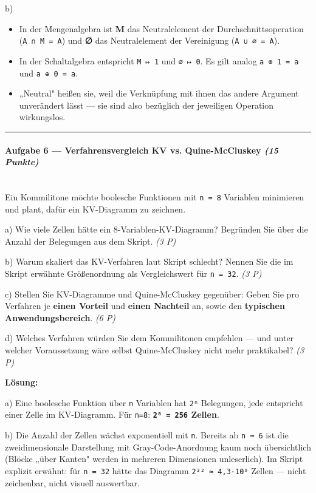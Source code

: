 \documentclass[11pt, a4paper]{article}
\begin{document}
b)

\begin{itemize}
  \item In der Mengenalgebra ist \textbf{M} das Neutralelement der Durchschnittsoperation (\texttt{A ∩ M = A}) und \textbf{∅} das Neutralelement der Vereinigung (\texttt{A ∪ ∅ = A}).
  \item In der Schaltalgebra entspricht \texttt{M ↦ 1} und \texttt{∅ ↦ 0}. Es gilt analog \texttt{a ⊗ 1 = a} und \texttt{a ⊕ 0 = a}.
  \item „Neutral" heißen sie, weil die Verknüpfung mit ihnen das andere Argument unverändert lässt — sie sind also bezüglich der jeweiligen Operation wirkungslos.
\end{itemize}


\noindent\textcolor{rulegray}{\rule{\linewidth}{0.4pt}}


\paragraph{Aufgabe 6 — Verfahrensvergleich KV vs. Quine-McCluskey \textit{(15 Punkte)}}\mbox{}\\[2pt]

Ein Kommilitone möchte boolesche Funktionen mit \texttt{n = 8} Variablen minimieren und plant, dafür ein KV-Diagramm zu zeichnen.


a) Wie viele Zellen hätte ein 8-Variablen-KV-Diagramm? Begründen Sie über die Anzahl der Belegungen aus dem Skript. \textit{(3 P)}


b) Warum skaliert das KV-Verfahren laut Skript schlecht? Nennen Sie die im Skript erwähnte Größenordnung als Vergleichswert für \texttt{n = 32}. \textit{(3 P)}


c) Stellen Sie KV-Diagramme und Quine-McCluskey gegenüber: Geben Sie pro Verfahren je \textbf{einen Vorteil} und \textbf{einen Nachteil} an, sowie den \textbf{typischen Anwendungsbereich}. \textit{(6 P)}


d) Welches Verfahren würden Sie dem Kommilitonen empfehlen — und unter welcher Voraussetzung wäre selbst Quine-McCluskey nicht mehr praktikabel? \textit{(3 P)}


\textbf{Lösung:}


a) Eine boolesche Funktion über \texttt{n} Variablen hat \texttt{2ⁿ} Belegungen, jede entspricht einer Zelle im KV-Diagramm. Für \texttt{n=8}: \textbf{\texttt{2⁸ = 256} Zellen}.


b) Die Anzahl der Zellen wächst exponentiell mit \texttt{n}. Bereits ab \texttt{n ≈ 6} ist die zweidimensionale Darstellung mit Gray-Code-Anordnung kaum noch übersichtlich (Blöcke „über Kanten" werden in mehreren Dimensionen unleserlich). Im Skript explizit erwähnt: für \texttt{n = 32} hätte das Diagramm \texttt{2³² ≈ 4,3·10⁹} Zellen — nicht zeichenbar, nicht visuell auswertbar.
\end{document}
